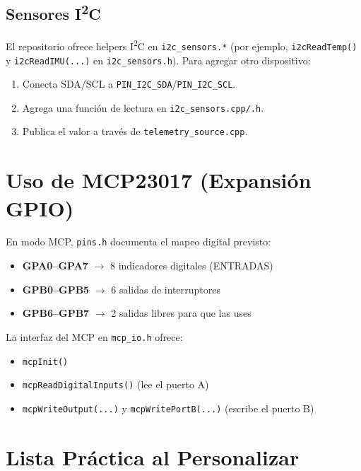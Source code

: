\subsection{Sensores I\textsuperscript{2}C}
El repositorio ofrece helpers I\textsuperscript{2}C en \texttt{i2c\_sensors.*} (por ejemplo, \verb|i2cReadTemp()| y
\verb|i2cReadIMU(...)| en \texttt{i2c\_sensors.h}). Para agregar otro dispositivo:
\begin{enumerate}
    \item Conecta SDA/SCL a \texttt{PIN\_I2C\_SDA}/\texttt{PIN\_I2C\_SCL}.
    \item Agrega una función de lectura en \texttt{i2c\_sensors.cpp/.h}.
    \item Publica el valor a través de \texttt{telemetry\_source.cpp}.
\end{enumerate}

\section{Uso de MCP23017 (Expansión GPIO)}

En modo MCP, \texttt{pins.h} documenta el mapeo digital previsto:

\begin{itemize}
    \item \textbf{GPA0--GPA7} $\rightarrow$ 8 indicadores digitales (ENTRADAS)
    \item \textbf{GPB0--GPB5} $\rightarrow$ 6 salidas de interruptores
    \item \textbf{GPB6--GPB7} $\rightarrow$ 2 salidas libres para que las uses
\end{itemize}

La interfaz del MCP en \texttt{mcp\_io.h} ofrece:

\begin{itemize}
    \item \verb|mcpInit()|
    \item \verb|mcpReadDigitalInputs()| (lee el puerto A)
    \item \verb|mcpWriteOutput(...)| y \verb|mcpWritePortB(...)| (escribe el puerto B)
\end{itemize}

\section{Lista Práctica al Personalizar}

